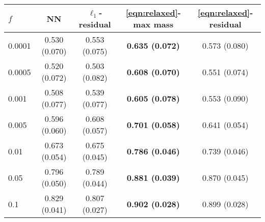 \begin{tabular}{|l||c|c|c|c|}
\hline
$f$ & NN & $\ell_1$-residual & \eqref{eqn:relaxed}-max mass & \eqref{eqn:relaxed}-residual \\
\hline\hline
0.0001 & 0.530 (0.070) & 0.553 (0.075) & \textbf{0.635 (0.072)} & 0.573 (0.080) \\
\hline
0.0005 & 0.520 (0.072) & 0.503 (0.082) & \textbf{0.608 (0.070)} & 0.551 (0.074) \\
\hline
0.001 & 0.508 (0.077) & 0.539 (0.077) & \textbf{0.605 (0.078)} & 0.553 (0.090) \\
\hline
0.005 & 0.596 (0.060) & 0.608 (0.057) & \textbf{0.701 (0.058)} & 0.641 (0.054) \\
\hline
0.01 & 0.673 (0.054) & 0.675 (0.045) & \textbf{0.786 (0.046)} & 0.739 (0.046) \\
\hline
0.05 & 0.796 (0.050) & 0.789 (0.044) & \textbf{0.881 (0.039)} & 0.870 (0.045) \\
\hline
0.1 & 0.829 (0.041) & 0.807 (0.027) & \textbf{0.902 (0.028)} & 0.899 (0.028) \\
\hline
\end{tabular}